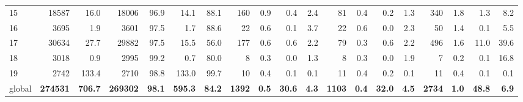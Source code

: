 \begin{tabular}{lrrrrrrrrrrrrrrrrrr}
15 & 18587 & 16.0 & 18006 & 96.9 & 14.1 & 88.1 & 160 & 0.9 & 0.4 & 2.4 & 81 & 0.4 & 0.2 & 1.3 & 340 & 1.8 & 1.3 & 8.2 \\
16 & 3695 & 1.9 & 3601 & 97.5 & 1.7 & 88.6 & 22 & 0.6 & 0.1 & 3.7 & 22 & 0.6 & 0.0 & 2.3 & 50 & 1.4 & 0.1 & 5.5 \\
17 & 30634 & 27.7 & 29882 & 97.5 & 15.5 & 56.0 & 177 & 0.6 & 0.6 & 2.2 & 79 & 0.3 & 0.6 & 2.2 & 496 & 1.6 & 11.0 & 39.6 \\
18 & 3018 & 0.9 & 2995 & 99.2 & 0.7 & 80.0 & 8 & 0.3 & 0.0 & 1.3 & 8 & 0.3 & 0.0 & 1.9 & 7 & 0.2 & 0.1 & 16.8 \\
19 & 2742 & 133.4 & 2710 & 98.8 & 133.0 & 99.7 & 10 & 0.4 & 0.1 & 0.1 & 11 & 0.4 & 0.2 & 0.1 & 11 & 0.4 & 0.1 & 0.1 \\
global & \textbf{274531} & \textbf{706.7} & \textbf{269302} & \textbf{98.1} & \textbf{595.3} & \textbf{84.2} & \textbf{1392} & \textbf{0.5} & \textbf{30.6} & \textbf{4.3} & \textbf{1103} & \textbf{0.4} & \textbf{32.0} & \textbf{4.5} & \textbf{2734} & \textbf{1.0} & \textbf{48.8} & \textbf{6.9} \\
\end{tabular}


